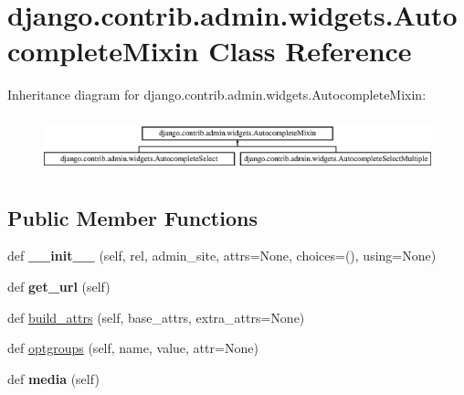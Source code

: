 \hypertarget{classdjango_1_1contrib_1_1admin_1_1widgets_1_1_autocomplete_mixin}{}\section{django.\+contrib.\+admin.\+widgets.\+Autocomplete\+Mixin Class Reference}
\label{classdjango_1_1contrib_1_1admin_1_1widgets_1_1_autocomplete_mixin}
Inheritance diagram for django.\+contrib.\+admin.\+widgets.\+Autocomplete\+Mixin\+:\begin{figure}[H]
\begin{center}
\leavevmode
\includegraphics[height=1.632653cm]{classdjango_1_1contrib_1_1admin_1_1widgets_1_1_autocomplete_mixin}
\end{center}
\end{figure}
\subsection*{Public Member Functions}
\begin{DoxyCompactItemize}
\item 
\mbox{\label{classdjango_1_1contrib_1_1admin_1_1widgets_1_1_autocomplete_mixin_ac8c7171f0b8bbaa196669a1c75decabd}} 
def {\bfseries \+\_\+\+\_\+init\+\_\+\+\_\+} (self, rel, admin\+\_\+site, attrs=None, choices=(), using=None)
\item 
\mbox{\label{classdjango_1_1contrib_1_1admin_1_1widgets_1_1_autocomplete_mixin_a0162b48811ace56fdf26de068864f19d}} 
def {\bfseries get\+\_\+url} (self)
\item 
def \mbox{\hyperlink{classdjango_1_1contrib_1_1admin_1_1widgets_1_1_autocomplete_mixin_a176090ce6f09cb6a66c1c8cd9bcc11f4}{build\+\_\+attrs}} (self, base\+\_\+attrs, extra\+\_\+attrs=None)
\item 
def \mbox{\hyperlink{classdjango_1_1contrib_1_1admin_1_1widgets_1_1_autocomplete_mixin_a8fecb93266bf420ef2ec7c5f6a553573}{optgroups}} (self, name, value, attr=None)
\item 
\mbox{\label{classdjango_1_1contrib_1_1admin_1_1widgets_1_1_autocomplete_mixin_a0d5bc2cf93d2447ae1a05cacafe1101b}} 
def {\bfseries media} (self)
\end{DoxyCompactItemize}
